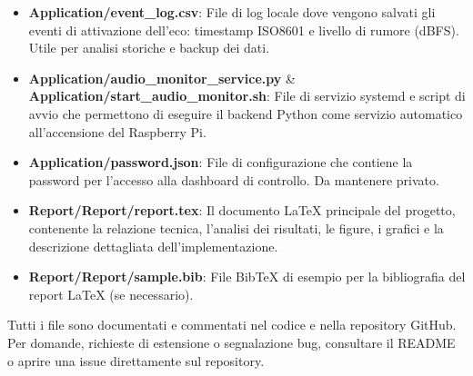 \documentclass[fleqn,10pt]{SelfArx} %
\begin{document}
\begin{itemize}
	\item \textbf{Application/event\_log.csv}: %
	File di log locale dove vengono salvati gli eventi di attivazione dell'eco: timestamp ISO8601 e livello di rumore (dBFS). Utile per analisi storiche e backup dei dati.	
	
	
	\item \textbf{Application/audio\_monitor\_service.py} \& \textbf{Application/start\_audio\_monitor.sh}:  
	File di servizio systemd e script di avvio che permettono di eseguire il backend Python come servizio automatico all'accensione del Raspberry Pi.	
	
	
	\item \textbf{Application/password.json}:  %
	File di configurazione che contiene la password per l’accesso alla dashboard di controllo. Da mantenere privato.
	
	\item \textbf{Report/Report/report.tex}:  
	Il documento LaTeX principale del progetto, contenente la relazione tecnica, l'analisi dei risultati, le figure, i grafici e la descrizione dettagliata dell'implementazione.
	
	\item \textbf{Report/Report/sample.bib}:  
	File BibTeX di esempio per la bibliografia del report LaTeX (se necessario).
	
\end{itemize}

Tutti i file sono documentati e commentati nel codice e nella repository GitHub.  
Per domande, richieste di estensione o segnalazione bug, consultare il README o aprire una issue direttamente sul repository.

\end{document}
